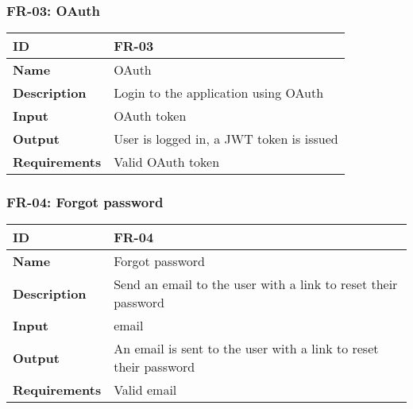     \subsubsection{FR-03: OAuth}
    \begin{center}
        \begin{tabularx}{\textwidth}{|l|X|}
            \hline
            \textbf{ID} & FR-03 \\
            \hline
            \textbf{Name} & OAuth \\
            \hline
            \textbf{Description} & Login to the application using OAuth \\
            \hline
            \textbf{Input} & OAuth token \\
            \hline
            \textbf{Output} & User is logged in, a JWT token is issued \\
            \hline
            \textbf{Requirements} & Valid OAuth token \\
            \hline
        \end{tabularx}
    \end{center}
    
    

    \subsubsection{FR-04: Forgot password}
    \begin{center}
        \begin{tabularx}{\textwidth}{|l|X|}
            \hline
            \textbf{ID} & FR-04 \\
            \hline
            \textbf{Name} & Forgot password \\
            \hline
            \textbf{Description} & Send an email to the user with a link to reset their password \\
            \hline
            \textbf{Input} & email \\
            \hline
            \textbf{Output} & An email is sent to the user with a link to reset their password \\
            \hline
            \textbf{Requirements} & Valid email \\
            \hline
        \end{tabularx}
    \end{center}
    \newpage
    

